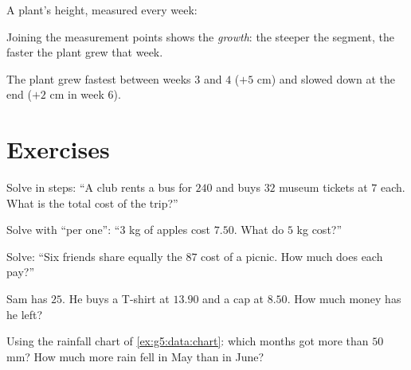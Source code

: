 \begin{example}\label{ex:g5:data:line}
A plant's height, measured every week:

\begin{omfigure}

{\small Joining the measurement points shows the \emph{growth}: the
steeper the segment, the faster the plant grew that week.}
\end{omfigure}

The plant grew fastest between weeks $3$ and $4$ ($+5$ cm) and
slowed down at the end ($+2$ cm in week $6$).
\end{example}

\section{Exercises}

\begin{exercise}[$\star$]\label{exo:g5:data:1}
Solve in steps: ``A club rents a bus for $240$ and buys $32$ museum
tickets at $7$ each. What is the total cost of the trip?''
\end{exercise}

\begin{exercise}[$\star$]\label{exo:g5:data:2}
Solve with ``per one'': ``$3$ kg of apples cost $7.50$. What do
$5$ kg cost?''
\end{exercise}

\begin{exercise}[$\star$]\label{exo:g5:data:3}
Solve: ``Six friends share equally the $87$ cost of a picnic. How
much does each pay?''
\end{exercise}

\begin{exercise}[$\star$]\label{exo:g5:data:4}
Sam has $25$. He buys a T-shirt at $13.90$ and a cap at $8.50$. How
much money has he left?
\end{exercise}

\begin{exercise}[$\star$]\label{exo:g5:data:5}
Using the rainfall chart of \cref{ex:g5:data:chart}: which months
got more than $50$ mm? How much more rain fell in May than in
June?
\end{exercise}

